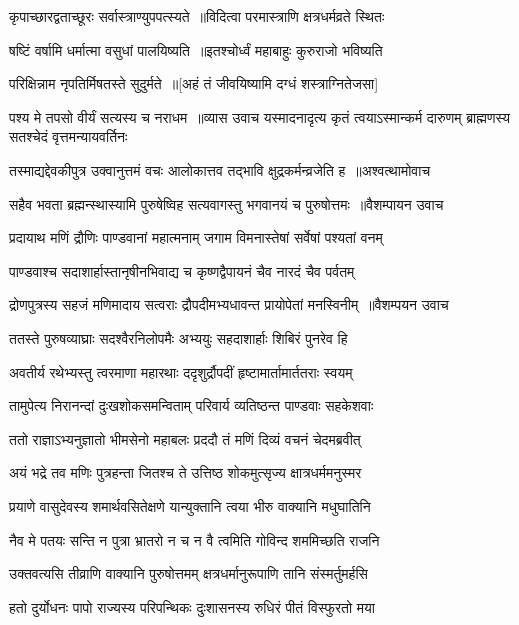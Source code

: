 \twolineshloka
{कृपाच्छारद्वताच्छूरः सर्वास्त्राण्युपपत्स्यते ॥विदित्वा परमास्त्राणि क्षत्रधर्मव्रते स्थितः}
{}


\twolineshloka
{षष्टिं वर्षामि धर्मात्मा वसुधां पालयिष्यति ॥इतश्चोर्ध्वं महाबाहुः कुरुराजो भविष्यति}
{}


\twolineshloka
{परिक्षिन्नाम नृपतिर्मिषतस्ते सुदुर्मते ॥[अहं तं जीवयिष्यामि दग्धं शस्त्राग्नितेजसा]}
{}


\threelineshloka
{पश्य मे तपसो वीर्यं सत्यस्य च नराधम ॥व्यास उवाच}
{यस्मादनादृत्य कृतं त्वयाऽस्मान्कर्म दारुणम्}
{ब्राह्मणस्य सतश्चेदं वृत्तमन्यायवर्तिनः}


\threelineshloka
{तस्माद्यद्देवकीपुत्र उक्वानुत्तमं वचः}
{आलोकात्तव तद्भावि क्षुद्रकर्मन्व्रजेति ह ॥अश्वत्थामोवाच}
{}


\threelineshloka
{सहैव भवता ब्रह्मन्स्थास्यामि पुरुषेष्विह}
{सत्यवागस्तु भगवानयं च पुरुषोत्तमः ॥वैशम्पायन उवाच}
{}


\twolineshloka
{प्रदायाथ मणिं द्रौणिः पाण्डवानां महात्मनाम्}
{जगाम विमनास्तेषां सर्वेषां पश्यतां वनम्}


\twolineshloka
{पाण्डवाश्च सदाशार्हास्तानृषीनभिवाद्य च}
{कृष्णद्वैपायनं चैव नारदं चैव पर्वतम्}


\threelineshloka
{द्रोणपुत्रस्य सहजं मणिमादाय सत्वराः}
{द्रौपदीमभ्यधावन्त प्रायोपेतां मनस्विनीम् ॥वैशम्पयन उवाच}
{}


\twolineshloka
{ततस्ते पुरुषव्याघ्राः सदश्वैरनिलोपमैः}
{अभ्ययुः सहदाशार्हाः शिबिरं पुनरेव हि}


\twolineshloka
{अवतीर्य रथेभ्यस्तु त्वरमाणा महारथाः}
{ददृशुर्द्रौपदीं हृष्टामार्तामार्ततराः स्वयम्}


\twolineshloka
{तामुपेत्य निरानन्दां दुःखशोकसमन्विताम्}
{परिवार्य व्यतिष्ठन्त पाण्डवाः सहकेशवाः}


\twolineshloka
{ततो राज्ञाऽभ्यनुज्ञातो भीमसेनो महाबलः}
{प्रददौ तं मणिं दिव्यं वचनं चेदमब्रवीत्}


\twolineshloka
{अयं भद्रे तव मणिः पुत्रहन्ता जितश्च ते}
{उत्तिष्ठ शोकमुत्सृज्य क्षात्रधर्ममनुस्मर}


\twolineshloka
{प्रयाणे वासुदेवस्य शमार्थवसितेक्षणे}
{यान्युक्तानि त्वया भीरु वाक्यानि मधुघातिनि}


\twolineshloka
{नैव मे पतयः सन्ति न पुत्रा भ्रातरो न च}
{न वै त्वमिति गोविन्द शममिच्छति राजनि}


\twolineshloka
{उक्तवत्यसि तीव्राणि वाक्यानि पुरुषोत्तमम्}
{क्षत्रधर्मानुरूपाणि तानि संस्मर्तुमर्हसि}


\twolineshloka
{हतो दुर्योधनः पापो राज्यस्य परिपन्थिकः}
{दुःशासनस्य रुधिरं पीतं विस्फुरतो मया}


